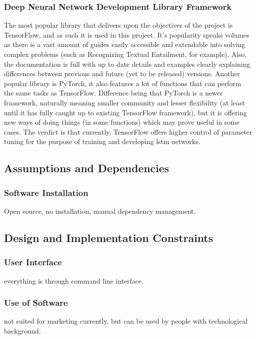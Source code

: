         \subsubsection{Deep Neural Network Development Library Framework}
            The most popular library that delivers upon the objectives of the project is TensorFlow, and as such it is used in this project. It's popularity speaks volumes as there is a vast amount of guides easily accessible and extendable into solving complex problems (such as Recognizing Textual Entailment, for example). Also, the documentation is full with up to date details and examples clearly explaining differences between previous and future (yet to be released) versions. Another popular library is PyTorch, it also features a lot of functions that can perform the same tasks as TensorFlow. Difference being that PyTorch is a newer framework, naturally meaning smaller community and lesser flexibility (at least until it has fully caught up to existing TensorFlow framework), but it is offering new ways of doing things (in some functions) which may prove useful in some cases. The verdict is that currently, TensorFlow offers higher control of parameter tuning for the purpose of training and developing \gls{lstm} networks.
        
    \subsection{Assumptions and Dependencies} \label{assumptionsdependencies}
        
        \subsubsection{Software Installation}
            Open source, no installation, manual dependency management.
    
    \subsection{Design and Implementation Constraints} \label{designconstraints}
        
        \subsubsection{User Interface}
            everything is through command line interface.
        
        \subsubsection{Use of Software}
            not suited for marketing currently, but can be used by people with technological background.
    

